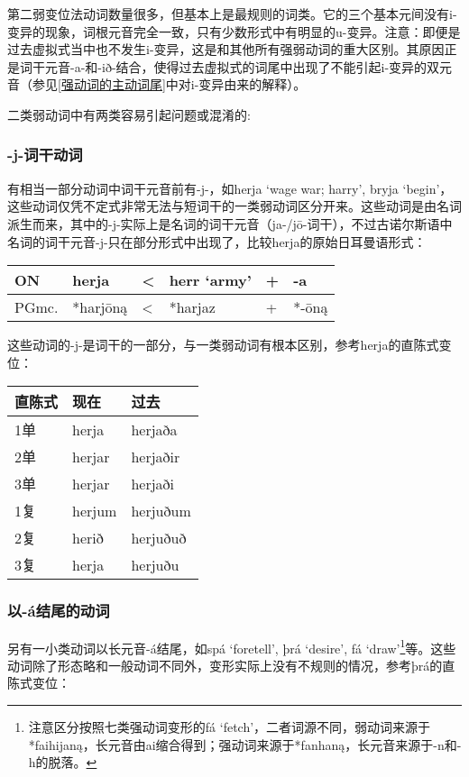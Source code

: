 第二弱变位法动词数量很多，但基本上是最规则的词类。它的三个基本元间没有i-变异的现象，词根元音完全一致，只有少数形式中有明显的u-变异。注意：即便是过去虚拟式当中也不发生i-变异，这是和其他所有强弱动词的重大区别。其原因正是词干元音-a-和-ið-结合，使得过去虚拟式的词尾中出现了不能引起i-变异的双元音（参见\ref{强动词的主动词尾}中对i-变异由来的解释）。

二类弱动词中有两类容易引起问题或混淆的:


\subsubsection{-j-词干动词}


有相当一部分动词中词干元音前有-j-，如herja `wage war; harry', bryja
`begin'，这些动词仅凭不定式非常无法与短词干的一类弱动词区分开来。这些动词是由名词派生而来，其中的-j-实际上是名词的词干元音（ja-/jō-词干），不过古诺尔斯语中名词的词干元音-j-只在部分形式中出现了，比较herja的原始日耳曼语形式：

\begin{longtable}{llllll}
    \toprule
    ON    & herja    & < & herr `army' & + & -a    \\
    \midrule
    \endhead
    \bottomrule
    \endfoot
    PGmc. & *harjōną & < & *harjaz     & + & *-ōną \\
\end{longtable}

这些动词的-j-是词干的一部分，与一类弱动词有根本区别，参考herja的直陈式变位：

\begin{longtable}{lll}
    \toprule
    直陈式 & 现在   & 过去     \\
    \midrule
    \endhead
    \bottomrule
    \endfoot
    1单    & herja  & herjaða  \\
    2单    & herjar & herjaðir \\
    3单    & herjar & herjaði  \\
    1复    & herjum & herjuðum \\
    2复    & herið  & herjuðuð \\
    3复    & herja  & herjuðu  \\
\end{longtable}


\subsubsection{以-á结尾的动词}


另有一小类动词以长元音-á结尾，如spá `foretell', þrá `desire', fá `draw'\footnote{注意区分按照七类强动词变形的fá `fetch'，二者词源不同，弱动词来源于*faihijaną，长元音由ai缩合得到；强动词来源于*fanhaną，长元音来源于-n和-h的脱落。}等。这些动词除了形态略和一般动词不同外，变形实际上没有不规则的情况，参考þrá的直陈式变位：

